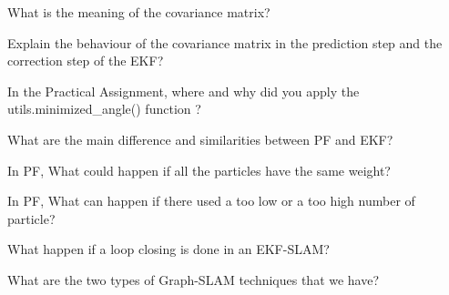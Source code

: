 \documentclass[parcial]{lcc}
\begin{document}
\maketitle




\ejercicio What is the meaning of the covariance matrix?

\ejercicio Explain the behaviour of the covariance matrix in the prediction step and the correction step of the EKF?

\ejercicio In the Practical Assignment, where and why did you apply the utils.minimized\_angle() function ?

\ejercicio What are the main difference and similarities between PF and EKF?

\ejercicio In PF, What could happen if all the particles have the same weight?

\ejercicio In PF, What can happen if there used a too low or a too high number of particle?

\ejercicio What happen if a loop closing is done in an EKF-SLAM?

\ejercicio What are the two types of Graph-SLAM techniques that we have?
\end{document}
